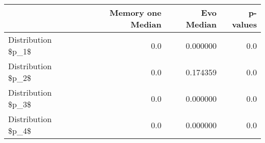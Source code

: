 \begin{tabular}{lrrr}
\toprule
{} &  Memory one Median &  Evo Median &  p-values \\
\midrule
Distribution \$p\_1\$ &                0.0 &    0.000000 &       0.0 \\
Distribution \$p\_2\$ &                0.0 &    0.174359 &       0.0 \\
Distribution \$p\_3\$ &                0.0 &    0.000000 &       0.0 \\
Distribution \$p\_4\$ &                0.0 &    0.000000 &       0.0 \\
\bottomrule
\end{tabular}
